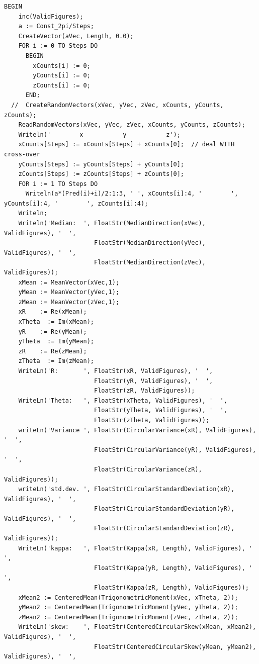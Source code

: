 \begin{refsection}
\begin{lstlisting}[caption=Test program]
  BEGIN
    inc(ValidFigures);
    a := Const_2pi/Steps;
    CreateVector(aVec, Length, 0.0);
    FOR i := 0 TO Steps DO
      BEGIN
        xCounts[i] := 0;
        yCounts[i] := 0;
        zCounts[i] := 0;
      END;
  //  CreateRandomVectors(xVec, yVec, zVec, xCounts, yCounts, zCounts);
    ReadRandomVectors(xVec, yVec, zVec, xCounts, yCounts, zCounts);
    Writeln('        x           y           z');
    xCounts[Steps] := xCounts[Steps] + xCounts[0];  // deal WITH cross-over
    yCounts[Steps] := yCounts[Steps] + yCounts[0];
    zCounts[Steps] := zCounts[Steps] + zCounts[0];
    FOR i := 1 TO Steps DO
      Writeln(a*(Pred(i)+i)/2:1:3, ' ', xCounts[i]:4, '        ', yCounts[i]:4, '        ', zCounts[i]:4);
    Writeln;
    Writeln('Median:  ', FloatStr(MedianDirection(xVec), ValidFigures), '  ',
                         FloatStr(MedianDirection(yVec), ValidFigures), '  ',
                         FloatStr(MedianDirection(zVec), ValidFigures));
    xMean := MeanVector(xVec,1);
    yMean := MeanVector(yVec,1);
    zMean := MeanVector(zVec,1);
    xR    := Re(xMean);
    xTheta  := Im(xMean);
    yR    := Re(yMean);
    yTheta  := Im(yMean);
    zR    := Re(zMean);
    zTheta  := Im(zMean);
    WriteLn('R:       ', FloatStr(xR, ValidFigures), '  ',
                         FloatStr(yR, ValidFigures), '  ',
                         FloatStr(zR, ValidFigures));
    WriteLn('Theta:   ', FloatStr(xTheta, ValidFigures), '  ',
                         FloatStr(yTheta, ValidFigures), '  ',
                         FloatStr(zTheta, ValidFigures));
    writeLn('Variance ', FloatStr(CircularVariance(xR), ValidFigures), '  ',
                         FloatStr(CircularVariance(yR), ValidFigures), '  ',
                         FloatStr(CircularVariance(zR), ValidFigures));
    writeLn('std.dev. ', FloatStr(CircularStandardDeviation(xR), ValidFigures), '  ',
                         FloatStr(CircularStandardDeviation(yR), ValidFigures), '  ',
                         FloatStr(CircularStandardDeviation(zR), ValidFigures));
    WriteLn('kappa:   ', FloatStr(Kappa(xR, Length), ValidFigures), '  ',
                         FloatStr(Kappa(yR, Length), ValidFigures), '  ',
                         FloatStr(Kappa(zR, Length), ValidFigures));
    xMean2 := CenteredMean(TrigonometricMoment(xVec, xTheta, 2));
    yMean2 := CenteredMean(TrigonometricMoment(yVec, yTheta, 2));
    zMean2 := CenteredMean(TrigonometricMoment(zVec, zTheta, 2));
    WriteLn('skew:    ', FloatStr(CenteredCircularSkew(xMean, xMean2), ValidFigures), '  ',
                         FloatStr(CenteredCircularSkew(yMean, yMean2), ValidFigures), '  ',

\end{lstlisting}
\end{refsection}
